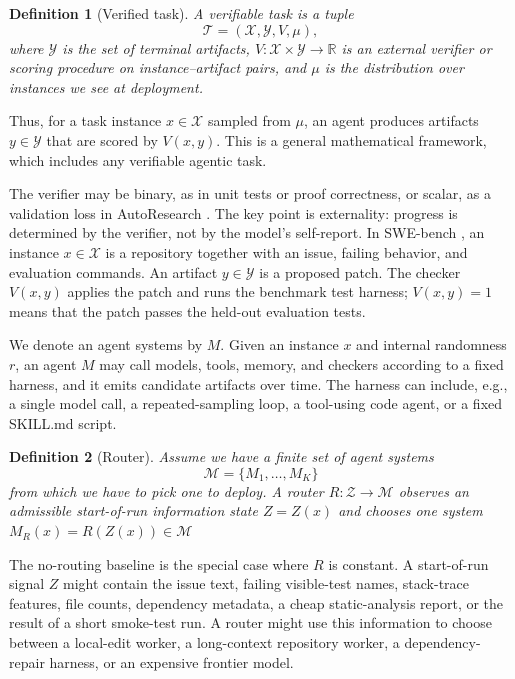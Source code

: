 \documentclass{article}
\newtheorem{definition}{Definition}
\newcommand{\cM}{\mathcal{M}}
\newcommand{\cX}{\mathcal{X}}
\newcommand{\cY}{\mathcal{Y}}
\begin{document}
\begin{definition}[Verified task]
\label{def:verified-task}
A verifiable task is a tuple
\[
\mathcal T=(\mathcal X,\mathcal Y,V,\mu),
\]
where $\mathcal Y$ is the set of terminal artifacts,
$V: \mathcal{X} \times \mathcal{Y} \to \mathbb R$ is an external verifier or scoring procedure on instance--artifact pairs, and
$\mu$ is the distribution over instances we see at deployment.
\end{definition}
Thus, for a task instance $x\in\mathcal X$ sampled from $\mu$, an agent produces artifacts $y\in\mathcal Y$ that are scored by $V(x,y)$. This is a general mathematical framework, which includes any verifiable agentic task.

The verifier may be binary, as in unit tests or proof correctness, or scalar, as a validation loss in AutoResearch \citep{karpathy2026autoresearch}.
The key point is externality: progress is determined by the verifier, not by the model's self-report.
In SWE-bench \citet{jimenez2024swebench}, an instance \(x\in\cX\) is a repository together with an issue, failing behavior, and evaluation commands.
An artifact \(y\in\cY\) is a proposed patch.
The checker \(V(x,y)\) applies the patch and runs the benchmark test harness; \(V(x,y)=1\) means that the patch passes the held-out evaluation tests.

We denote an agent systems by $M$.
Given an instance \(x\) and internal randomness \(r\), an agent $M$ may call models, tools, memory, and checkers according to a fixed harness, and it emits candidate artifacts over time. The harness can include, e.g., a single model call, a repeated-sampling loop, a tool-using code agent, or a fixed SKILL.md script.

\begin{definition}[Router]
\label{def:router}
Assume we have a finite set of agent systems
\[
    \cM=\{M_1,\ldots,M_K\}
\]
from which we have to pick one to deploy.
A router $R:\mathcal Z\to\cM$ observes an admissible start-of-run information state \(Z=Z(x)\) and chooses one system $M_R(x) = R(Z(x)) \in \mathcal{M}$

\end{definition}
The no-routing baseline is the special case where \(R\) is constant.
A start-of-run signal \(Z\) might contain the issue text, failing visible-test names, stack-trace features, file counts, dependency metadata, a cheap static-analysis report, or the result of a short smoke-test run.
A router might use this information to choose between a local-edit worker, a long-context repository worker, a dependency-repair harness, or an expensive frontier model.
\end{document}
